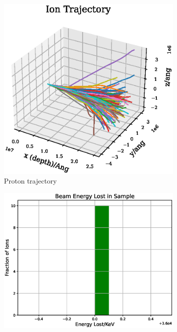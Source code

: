 \begin{figure}[htb]
\centering
\begin{subfigure}{0.49\textwidth}
  \includegraphics[width=\linewidth]{chapters/activity_code/images/trajectory_3d_full.eps}
  \caption{Proton trajectory}
  \label{fig:iontrajectory2}
\end{subfigure}\hfil
\begin{subfigure}{0.49\textwidth}
  \includegraphics[width=\linewidth]{chapters/activity_code/images/energy_lost_full.eps}

\end{subfigure}
\end{figure}
